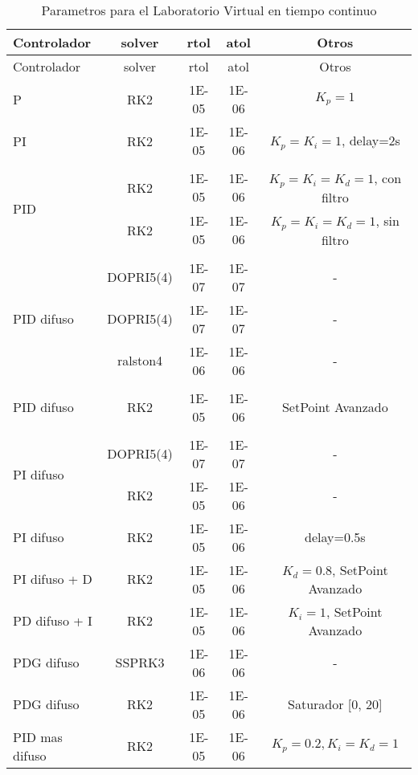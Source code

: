         {\setlength\LTleft{0pt}
        \setlength\LTright{0pt}
        \centering
        \footnotesize
        \renewcommand{\arraystretch}{0.89}
        \begin{longtable}{l @{\extracolsep{\fill}} cccc}
        \caption[Parametros para el Laboratorio Virtual en tiempo continuo]{Parametros para el Laboratorio Virtual en tiempo continuo} 
        \label{tab:parametrosLVc} \\
        \toprule
        Controlador  & solver & rtol & atol & Otros       \\ \midrule
        \endfirsthead
        \toprule
        Controlador  & solver & rtol & atol & Otros       \\ \midrule
        \endhead
        \bottomrule
        \endfoot
         P                          & RK2       & \num{1E-05} & \num{1E-06} & $K_p=1$ \\
         PI                         & RK2       & \num{1E-05} & \num{1E-06} & $K_p=K_i=1$, delay=2s \\
         &&&& \\[-3pt]
         \multirow{2}{*}{PID}       & RK2       & \num{1E-05} & \num{1E-06} & $K_p=K_i=K_d=1$, con filtro \\
                                    & RK2       & \num{1E-05} & \num{1E-06} & $K_p=K_i=K_d=1$, sin filtro \\
         &&&& \\[-3pt]
         \multirow{3}{*}{PID difuso}& DOPRI5(4) & \num{1E-07} & \num{1E-07} & - \\
                                    & DOPRI5(4) & \num{1E-07} & \num{1E-07} & - \\
                                    & ralston4  & \num{1E-06} & \num{1E-06} & - \\
         &&&& \\[-3pt]
         PID difuso                 & RK2       & \num{1E-05} & \num{1E-06} & SetPoint Avanzado \\
         &&&& \\[-3pt]
         \multirow{2}{*}{PI difuso} & DOPRI5(4) & \num{1E-07} & \num{1E-07} & - \\
                                    & RK2       & \num{1E-05} & \num{1E-06} & - \\
         PI difuso                  & RK2       & \num{1E-05} & \num{1E-06} & delay=0.5s \\
         PI difuso + D              & RK2       & \num{1E-05} & \num{1E-06} & $K_d=0.8$, SetPoint Avanzado \\
         PD difuso + I              & RK2       & \num{1E-05} & \num{1E-06} & $K_i=1$, SetPoint Avanzado \\
         PDG difuso                 & SSPRK3    & \num{1E-06} & \num{1E-06} & - \\
         PDG difuso                 & RK2       & \num{1E-05} & \num{1E-06} & Saturador [0, 20] \\
         PID mas difuso             & RK2       & \num{1E-05} & \num{1E-06} & $K_p=0.2, K_i=K_d=1$ \\
        \end{longtable}}

